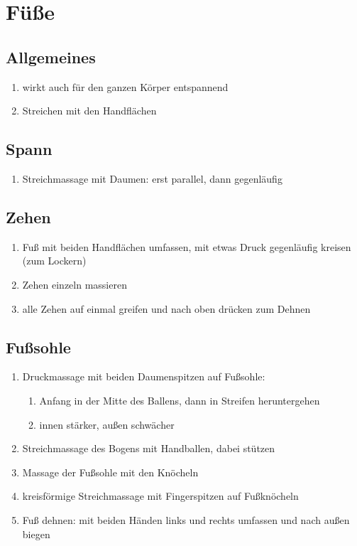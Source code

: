\section{Füße}

\subsection{Allgemeines}
\begin{enumerate}
\item wirkt auch für den ganzen Körper entspannend
\item Streichen mit den Handflächen
\end{enumerate}

\subsection{Spann}
\begin{enumerate}
\item Streichmassage mit Daumen: erst parallel, dann gegenläufig
\end{enumerate}

\subsection{Zehen}
\begin{enumerate}
\item Fuß mit beiden Handflächen umfassen, mit etwas Druck gegenläufig kreisen (zum Lockern)
\item Zehen einzeln massieren
\item alle Zehen auf einmal greifen und nach oben drücken zum Dehnen
\end{enumerate}

\subsection{Fußsohle}
\begin{enumerate}
\item Druckmassage mit beiden Daumenspitzen auf Fußsohle:
	\begin{enumerate}
		\item Anfang in der Mitte des Ballens, dann in Streifen heruntergehen
		\item innen stärker, außen schwächer
	\end{enumerate}
\item Streichmassage des Bogens mit Handballen, dabei stützen
\item Massage der Fußsohle mit den Knöcheln
\item kreisförmige Streichmassage mit Fingerspitzen auf Fußknöcheln
\item Fuß dehnen: mit beiden Händen links und rechts umfassen und nach außen biegen
\end{enumerate}

